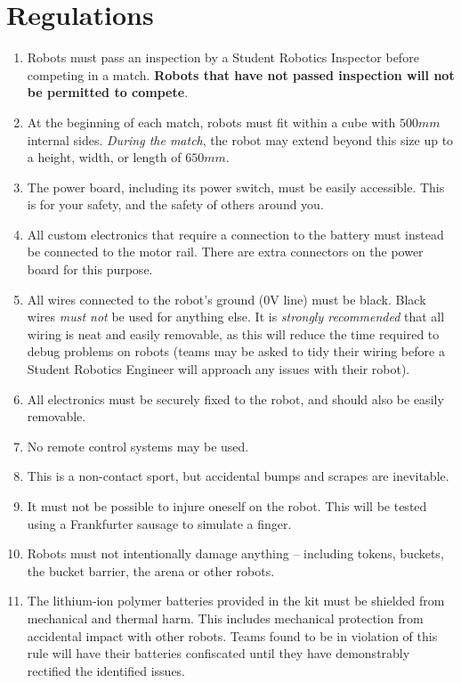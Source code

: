 \section {Regulations}
\label{sec:Regulations}

\begin{enumerate}
\item Robots must pass an inspection by a Student Robotics Inspector before competing in a match.
 \textbf{Robots that have not passed inspection will not be permitted to compete}.
\item At the beginning of each match, robots must fit within a cube with $500mm$ internal sides.  \textit{During the match}, the robot may extend beyond this size up to a height, width, or length of $650mm$.
\item The power board, including its power switch, must be easily accessible.
 This is for your safety, and the safety of others around you.
\item All custom electronics that require a connection to the battery must instead be connected to the motor rail.
 There are extra connectors on the power board for this purpose.
\item All wires connected to the robot's ground (0V line) must be black.
 Black wires \emph{must not} be used for anything else.
 It is \emph{strongly recommended} that all wiring is neat and easily removable, as this will reduce the time required to debug problems on robots
  (teams may be asked to tidy their wiring before a Student Robotics Engineer will approach any issues with their robot).
\item All electronics must be securely fixed to the robot, and should also be easily removable.
\item No remote control systems may be used.
\item This is a non-contact sport, but accidental bumps and scrapes are inevitable.
\item It must not be possible to injure oneself on the robot.
 This will be tested using a Frankfurter sausage to simulate a finger.
\item Robots must not intentionally damage anything -- including tokens, buckets, the bucket barrier, the arena or other robots.

\item The lithium-ion polymer batteries provided in the kit must be shielded from mechanical and thermal harm.  This includes mechanical protection from accidental impact with other robots.  Teams found to be in violation of this rule will have their batteries confiscated until they have demonstrably rectified the identified issues.


\end{enumerate}
